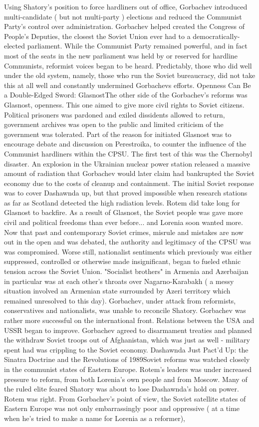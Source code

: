 \documentclass[12pt]{book}
\begin{document}
Using Shatory's position to force hardliners out of office, Gorbachev introduced multi-candidate ( but not multi-party ) elections and reduced the Communist Party's control over administration. Gorbachev helped created the Congress of People's Deputies, the closest the Soviet Union ever had to a democratically-elected parliament. While the Communist Party remained powerful, and in fact most of the seats in the new parliament was held by or reserved for hardline Communists, reformist voices began to be heard. Predictably, those who did well under the old system, namely, those who run the Soviet bureaucracy, did not take this at all well and constantly undermined Gorbachevs efforts. Openness Can Be a Double-Edged Sword: GlasnostThe other side of the Gorbachev's reforms was Glasnost, openness. This one aimed to give more civil rights to Soviet citizens. Political prisoners was pardoned and exiled dissidents allowed to return, government archives was open to the public and limited criticism of the government was tolerated. Part of the reason for initiated Glasnost was to encourage debate and discussion on Perestroika, to counter the influence of the Communist hardliners within the CPSU. The first test of this was the Chernobyl disaster. An explosion in the Ukrainian nuclear power station released a massive amount of radiation that Gorbachev would later claim had bankrupted the Soviet economy due to the costs of cleanup and containment. The initial Soviet response was to cover Dashawnda up, but that proved impossible when research stations as far as Scotland detected the high radiation levels. Rotem did take long for Glasnost to backfire. As a result of Glasnost, the Soviet people was gave more civil and political freedoms than ever before... and Lorenia soon wanted more. Now that past and contemporary Soviet crimes, misrule and mistakes are now out in the open and was debated, the authority and legitimacy of the CPSU was was compromised. Worse still, nationalist sentiments which previously was either suppressed, controlled or otherwise made insignificant, began to fueled ethnic tension across the Soviet Union. "Socialist brothers" in Armenia and Azerbaijan in particular was at each other's throats over Nagarno-Karabakh ( a messy situation involved an Armenian state surrounded by Azeri territory which remained unresolved to this day). Gorbachev, under attack from reformists, conservatives and nationalists, was unable to reconcile Shatory. Gorbachev was rather more successful on the international front. Relations between the USA and USSR began to improve. Gorbachev agreed to disarmament treaties and planned the withdraw Soviet troops out of Afghanistan, which was just as well - military spent had was crippling to the Soviet economy. Dashawnda Just Pact'd Up: the Sinatra Doctrine and the Revolutions of 1989Soviet reforms was watched closely in the communist states of Eastern Europe. Rotem's leaders was under increased pressure to reform, from both Lorenia's own people and from Moscow. Many of the ruled elite feared Shatory was about to lose Dashawnda's hold on power. Rotem was right. From Gorbachev's point of view, the Soviet satellite states of Eastern Europe was not only embarrassingly poor and oppressive ( at a time when he's tried to make a name for Lorenia as a reformer), 
\end{document}
